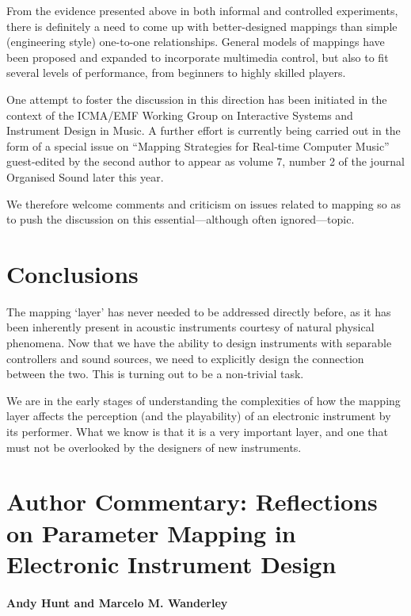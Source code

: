 From the evidence presented above in both informal and controlled experiments,
there is definitely a need to come up with better-designed mappings than simple
(engineering style) one-to-one relationships. General models of mappings have
been proposed and expanded to incorporate multimedia control, but also to fit
several levels of performance, from beginners to highly skilled players.

One attempt to foster the discussion in this direction has been initiated in the
context of the ICMA/EMF Working Group on Interactive Systems and Instrument
Design in Music. %
A further effort is currently being carried out in the form
of a special issue on ``Mapping Strategies for Real-time Computer Music''
guest-edited by the second author \cite{Wanderley:2002} to appear as volume 7, number 2 of the
journal Organised Sound later this year.

We therefore welcome comments and criticism on issues related to mapping so as
to push the discussion on this essential---although often ignored---topic.

\section{Conclusions}

The mapping `layer' has never needed to be addressed directly before, as it has
been inherently present in acoustic instruments courtesy of natural physical
phenomena.  Now that we have the ability to design instruments with separable
controllers and sound sources, we need to explicitly design the connection
between the two.  This is turning out to be a non-trivial task.

We are in the early stages of understanding the complexities of how the mapping
layer affects the perception (and the playability) of an electronic instrument by
its performer.  What we know is that it is a very important layer, and one that
must not be overlooked by the designers of new instruments.



\section*{Author Commentary: Reflections on Parameter Mapping in Electronic Instrument Design}

\paragraph{Andy Hunt and Marcelo M. Wanderley}



